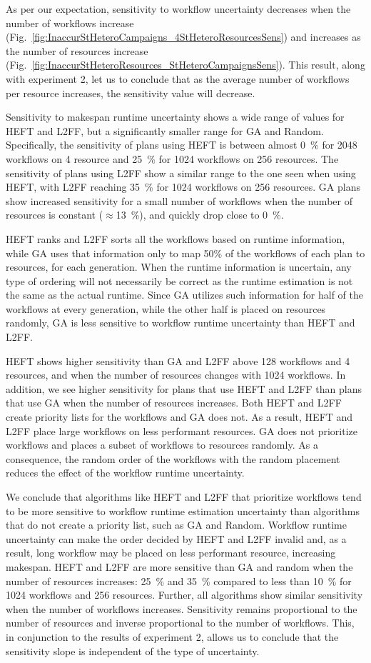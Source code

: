 As per our expectation, sensitivity to workflow uncertainty decreases when the
number of workflows increase
(Fig.~\ref{fig:InaccurStHeteroCampaigns_4StHeteroResourcesSens}) and increases
as the number of resources increase
(Fig.~\ref{fig:InaccurStHeteroResources_StHeteroCampaignsSens}). This result,
along with experiment 2, let us to conclude that as the average number of
workflows per resource increases, the sensitivity value will decrease.

Sensitivity to makespan runtime uncertainty shows a wide range of values for
HEFT and L2FF, but a significantly smaller range for GA and Random.
Specifically, the sensitivity of plans using HEFT is between almost 0~\% for
2048 workflows on 4 resource and 25~\% for 1024 workflows on 256 resources. The
sensitivity of plans using L2FF show a similar range to the one seen when using
HEFT, with L2FF reaching 35~\% for 1024 workflows on 256 resources. GA plans
show increased sensitivity for a small number of workflows when the number of
resources is constant ($\approx$13~\%), and quickly drop close to 0~\%.

HEFT ranks and L2FF sorts all the workflows based on runtime information, while
GA uses that information only to map 50\% of the workflows of each plan to
resources, for each generation. When the runtime information is uncertain, any
type of ordering will not necessarily be correct as the runtime estimation is
not the same as the actual runtime. Since GA utilizes such information for half
of the workflows at every generation, while the other half is placed on
resources randomly, GA is less sensitive to workflow runtime uncertainty than
HEFT and L2FF.

HEFT shows higher sensitivity than GA and L2FF above 128 workflows and 4
resources, and when the number of resources changes with 1024 workflows. In
addition, we see higher sensitivity for plans that use HEFT and L2FF than plans
that use GA when the number of resources increases. Both HEFT and L2FF create
priority lists for the workflows and GA does not. As a result, HEFT and L2FF
place large workflows on less performant resources. GA does not prioritize
workflows and places a subset of workflows to resources randomly. As a
consequence, the random order of the workflows with the random placement reduces
the effect of the workflow runtime uncertainty.

We conclude that algorithms like HEFT and L2FF that prioritize workflows tend to
be more sensitive to workflow runtime estimation uncertainty than algorithms
that do not create a priority list, such as GA and Random. Workflow runtime
uncertainty can make the order decided by HEFT and L2FF invalid and, as a
result, long workflow may be placed on less performant resource, increasing
makespan. HEFT and L2FF are more sensitive than GA and random when the number of
resources increases: 25~\% and 35~\% compared to less than 10~\% for 1024
workflows and 256 resources. Further, all algorithms show similar sensitivity
when the number of workflows increases. Sensitivity remains proportional to the
number of resources and inverse proportional to the number of workflows. This,
in conjunction to the results of experiment 2, allows us to conclude that the
sensitivity slope is independent of the type of uncertainty.

